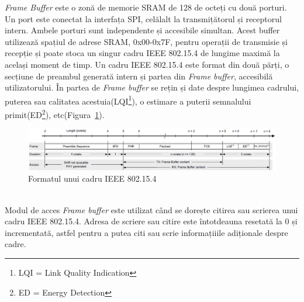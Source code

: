 \documentclass[12pt,a4paper]{report}
\begin{document}
\textit{Frame Buffer} este o zonă de memorie SRAM de 128 de octeți cu două porturi. Un port este conectat la interfața SPI, celălalt la transmițătorul și receptorul intern. Ambele porturi sunt independente și accesibile simultan. Acest buffer utilizează spațiul de adrese SRAM, 0x00-0x7F, pentru operații de transmisie și recepție și poate stoca un singur cadru IEEE 802.15.4 de lungime maximă la același moment de timp. Un cadru IEEE 802.15.4 este format din două părți, o secțiune de preambul generată intern și partea din \textit{Frame buffer}, accesibilă utilizatorului. În partea de \textit{Frame buffer} se rețin și date despre lungimea cadrului, puterea sau calitatea acestuia(LQI\footnote{LQI = Link Quality Indication}), o estimare a puterii semnalului primit(ED\footnote{ED = Energy Detection}), etc(Figura~\ref{fig:frame}).
\begin{figure}[h]
\centering
\includegraphics[scale=0.6]{pics/frame.png}
  \caption{Formatul unui cadru IEEE 802.15.4\cite{samr21ds}}
  \label{fig:frame}
\end{figure}\\
Modul de acces \textit{Frame buffer} este utilizat când se dorește citirea sau scrierea unui cadru IEEE 802.15.4. Adresa de scriere sau citire este întotdeauna resetată la 0 și incrementată, astfel pentru a putea citi sau scrie informațiiile adiționale despre cadre.
\end{document}
